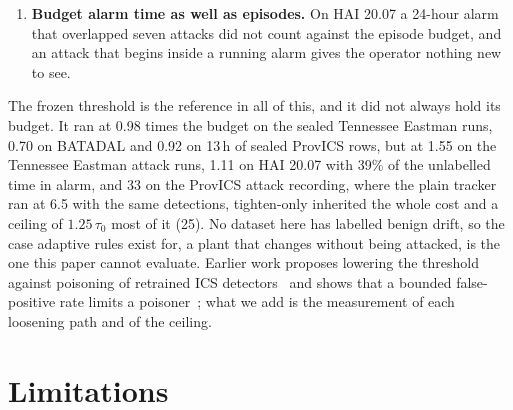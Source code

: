 \documentclass[letterpaper,twocolumn,10pt]{article}
\begin{document}
\begin{enumerate}
  when drift raises false alarms~\cite{cretu2008sanitizing}. Our only evidence is negative: a gate
  that approved loosening whenever the alarm log was quiet let the silent campaign through, and an
  oracle that blocked loosening only during labelled events caught 1 of 10 terminal steps; recalibration
  that trusts a quiet alarm log was poisoned by pulses too short to count, and recalibration on days an
  oracle knows to be clean was not (Section~\ref{sec:practice}). We tested no human operator.
\item \textbf{Budget alarm time as well as episodes.} On HAI 20.07 a 24-hour alarm that overlapped
  seven attacks did not count against the episode budget, and an attack that begins inside a running
  alarm gives the operator nothing new to see.
\end{enumerate}

The frozen threshold is the reference in all of this, and it did not always hold its budget. It ran at
0.98 times the budget on the sealed Tennessee Eastman runs, 0.70 on BATADAL and 0.92 on 13\,h of sealed
ProvICS rows, but at 1.55 on the Tennessee Eastman attack runs, 1.11 on HAI 20.07 with 39\% of the
unlabelled time in alarm, and 33 on the ProvICS attack recording, where the plain tracker ran at 6.5
with the same detections, tighten-only inherited the whole cost and a ceiling of $1.25\,\tau_0$ most of
it (25). No dataset here has labelled benign drift, so the case adaptive rules exist for, a plant that
changes without being attacked, is the one this paper cannot evaluate. Earlier work proposes lowering
the threshold against poisoning of retrained ICS detectors~\cite{kravchik2021poisoning} and shows that
a bounded false-positive rate limits a poisoner~\cite{kloft2012security}; what we add is the
measurement of each loosening path and of the ceiling.

\section{Limitations}
\label{sec:limitations}
\end{document}
